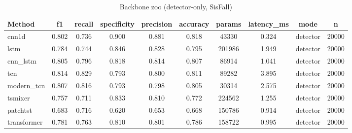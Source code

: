 \begin{table}[t]
\centering
\caption{Backbone zoo (detector-only, SisFall)}
\begin{tabular}{lccccccccc}
\toprule
Method & f1 & recall & specificity & precision & accuracy & params & latency_ms & mode & n \\
\midrule
cnn1d & 0.802 & 0.736 & 0.900 & 0.881 & 0.818 & 43330 & 0.324 & detector & 20000 \\
lstm & 0.784 & 0.744 & 0.846 & 0.828 & 0.795 & 201986 & 1.949 & detector & 20000 \\
cnn_lstm & 0.805 & 0.796 & 0.818 & 0.814 & 0.807 & 86914 & 1.041 & detector & 20000 \\
tcn & 0.814 & 0.829 & 0.793 & 0.800 & 0.811 & 89282 & 3.895 & detector & 20000 \\
modern_tcn & 0.807 & 0.816 & 0.793 & 0.798 & 0.805 & 30314 & 2.575 & detector & 20000 \\
tsmixer & 0.757 & 0.711 & 0.833 & 0.810 & 0.772 & 224562 & 1.255 & detector & 20000 \\
patchtst & 0.683 & 0.716 & 0.620 & 0.653 & 0.668 & 150786 & 0.914 & detector & 20000 \\
transformer & 0.781 & 0.763 & 0.810 & 0.801 & 0.786 & 158722 & 0.995 & detector & 20000 \\
\bottomrule
\end{tabular}
\end{table}